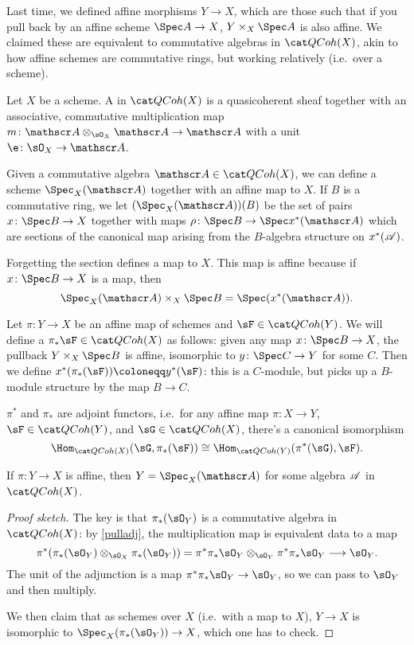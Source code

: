 Last time, we defined affine morphisms $Y\to X$, which are those such that if you pull back by an affine scheme
$\Spec A\to X$, $Y\times_X\Spec A$ is also affine. We claimed these are equivalent to commutative algebras in
$\QCoh(X)$, akin to how affine schemes are commutative rings, but working relatively (i.e.\ over a scheme).
\begin{defn}
Let $X$ be a scheme. A  in $\QCoh(X)$ is a quasicoherent sheaf together with an
associative, commutative multiplication map $m\colon\sA\otimes_{\sO_X}\sA\to\sA$ with a unit $\e\colon\sO_X\to\sA$.
\end{defn}
\begin{defn}
Given a commutative algebra $\sA\in\QCoh(X)$, we can define a scheme $\Spec_X(\sA)$ together with an affine map to
$X$. If $B$ is a commutative ring, we let $(\Spec_X(\sA))(B)$ be the set of pairs $x\colon\Spec B\to X$ together
with maps $\rho\colon\Spec B\to\Spec x^*(\sA)$ which are sections of the canonical map arising from the $B$-algebra
structure on $x^*(\mathscr A)$.
\end{defn}
Forgetting the section defines a map to $X$. This map is affine because if $x\colon \Spec B\to X$ is a map, then
\begin{equation}
	\Spec_X(\sA)\times_X \Spec B = \Spec(x^*(\sA)).
\end{equation}
\begin{defn}
Let $\pi\colon Y\to X$ be an affine map of schemes and $\sF\in\QCoh(Y)$. We will define a 
$\pi_*\sF\in\QCoh(X)$ as follows: given any map $x\colon\Spec B\to X$, the pullback $Y\times_X\Spec B$ is affine,
isomorphic to $y\colon \Spec C\to Y$ for some $C$. Then we define $x^*(\pi_*(\sF)) \coloneqq y^*(\sF)$: this is
 a $C$-module, but picks up a $B$-module structure by the map $B\to C$.
\end{defn}
\begin{ex}
\label{pulladj}
$\pi^*$ and $\pi_*$ are adjoint functors, i.e.\ for any affine map $\pi\colon X\to Y$, $\sF\in\QCoh(Y)$, and
$\sG\in\QCoh(X)$, there's a canonical isomorphism
\[\Hom_{\QCoh(X)}(\sG, \pi_*(\sF)) \cong \Hom_{\QCoh(Y)}(\pi^*(\sG), \sF).\]
\end{ex}
\begin{prop}
If $\pi\colon Y\to X$ is affine, then $Y = \Spec_X(\sA)$ for some algebra $\mathscr A$ in $\QCoh(X)$.
\end{prop}
\begin{proof}[Proof sketch]
The key is that $\pi_*(\sO_Y)$ is a commutative algebra in $\QCoh(X)$: by \cref{pulladj}, the multiplication map is
equivalent data to a map
\begin{equation}
	\pi^*(\pi_*(\sO_Y)\otimes_{\sO_X}\pi_*(\sO_Y)) = \pi^*\pi_*\sO_Y\otimes_{\sO_Y}\pi^*\pi_*\sO_Y\longrightarrow
	\sO_Y.
\end{equation}
The unit of the adjunction is a map $\pi^*\pi_*\sO_Y\to\sO_Y$, so we can pass to $\sO_Y$ and then multiply.

We then claim that as schemes over $X$ (i.e.\ with a map to $X$), $Y\to X$ is isomorphic to
$\Spec_X(\pi_*(\sO_Y))\to X$, which one has to check.
\end{proof}
